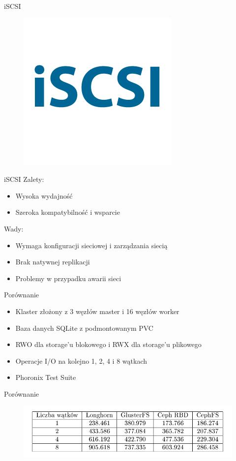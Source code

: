 \documentclass[polish,envcountsect,10pt]{beamer}
\begin{document}
\begin{frame}{iSCSI}
	\begin{figure}[H]
    	\includegraphics[width=0.4\linewidth]{images/iscsi.png}
	\end{figure}
\end{frame}

\begin{frame}{iSCSI}
	Zalety:
	\begin{itemize}
		\item Wysoka wydajność
		\item Szeroka kompatybilność i wsparcie 
	\end{itemize}
	\medskip
	Wady:
	\begin{itemize}
		\item Wymaga konfiguracji sieciowej i zarządzania siecią 
		\item Brak natywnej replikacji 
		\item Problemy w przypadku awarii sieci 
	\end{itemize}
\end{frame}

\begin{frame}{Porównanie}
	\begin{itemize}
		\item Klaster złożony z 3 węzłów master i 16 węzłów worker
		\item Baza danych SQLite z podmontowanym PVC
		\item RWO dla storage'u blokowego i RWX dla storage'u plikowego
		\item Operacje I/O na kolejno 1, 2, 4 i 8 wątkach
		\item Phoronix Test Suite
	\end{itemize}
\end{frame}

\begin{frame}{Porównanie}
	\begin{figure}[H]
    	\includegraphics[width=0.9\linewidth]{images/table.png}
	\end{figure}
\end{frame}
\end{document}
